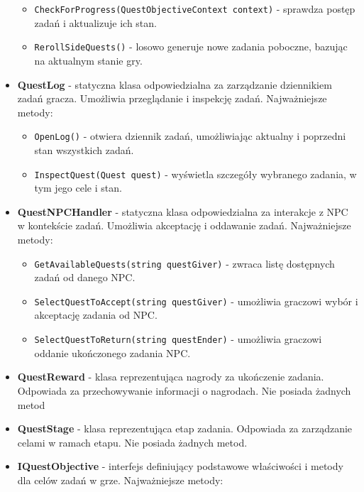 \begin{itemize}
\begin{itemize}
                    \item \texttt{CheckForProgress(QuestObjectiveContext context)} - sprawdza postęp zadań i aktualizuje ich stan.
                    \item \texttt{RerollSideQuests()} - losowo generuje nowe zadania poboczne, bazując na aktualnym stanie gry.
                \end{itemize}
            \item \textbf{QuestLog} - statyczna klasa odpowiedzialna za zarządzanie dziennikiem zadań gracza. Umożliwia przeglądanie i inspekcję zadań. Najważniejsze metody:
                \begin{itemize}
                    \item \texttt{OpenLog()} - otwiera dziennik zadań, umożliwiając aktualny i poprzedni stan wszystkich zadań.
                    \item \texttt{InspectQuest(Quest quest)} - wyświetla szczegóły wybranego zadania, w tym jego cele i stan.
                \end{itemize}
            \item \textbf{QuestNPCHandler} - statyczna klasa odpowiedzialna za interakcje z NPC w kontekście zadań.
            Umożliwia akceptację i oddawanie zadań. Najważniejsze metody:
                \begin{itemize}
                    \item \texttt{GetAvailableQuests(string questGiver)} - zwraca listę dostępnych zadań od danego NPC.
                    \item \texttt{SelectQuestToAccept(string questGiver)} - umożliwia graczowi wybór i akceptację zadania od NPC.
                    \item \texttt{SelectQuestToReturn(string questEnder)} - umożliwia graczowi oddanie ukończonego zadania NPC.
                \end{itemize}
            \item \textbf{QuestReward} - klasa reprezentująca nagrody za ukończenie zadania. Odpowiada za przechowywanie informacji o nagrodach. 
            Nie posiada żadnych metod
            \item \textbf{QuestStage} - klasa reprezentująca etap zadania. Odpowiada za zarządzanie celami w ramach etapu. Nie posiada żadnych metod.
            \item \textbf{IQuestObjective} - interfejs definiujący podstawowe właściwości i metody dla celów zadań w grze. 
            Najważniejsze metody:
                \begin{itemize}

\end{itemize}
\end{itemize}
